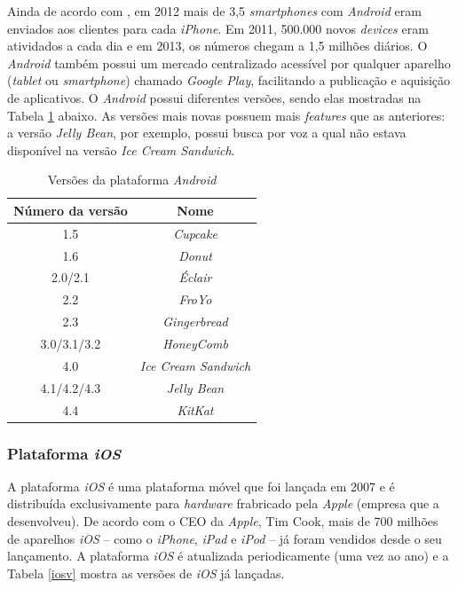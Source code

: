 	 Ainda de acordo com \cite{android2013}, em 2012 mais de 3,5 \textit{smartphones} com \textit{Android} eram enviados aos clientes para cada \textit{iPhone}. Em 2011, 500.000 novos \textit{devices} eram atividados a cada dia e em 2013, os números chegam a 1,5 milhões diários. O \textit{Android} também possui um mercado centralizado acessível por qualquer aparelho (\textit{tablet} ou \textit{smartphone}) chamado \textit{Google Play}, facilitando a publicação e aquisição de aplicativos. 
	O \textit{Android}  possui diferentes versões, sendo elas mostradas na Tabela \ref{androidTab} abaixo.  As versões mais novas possuem mais \textit{features} que as anteriores: a versão \textit{Jelly Bean}, por exemplo, possui busca por voz a qual não estava disponível na versão \textit{Ice Cream Sandwich}. 

\begin{table}[ht]
	\centering	
	\begin{tabular}{cc}
		\toprule
		\textbf{Número da versão} & \textbf{Nome}  \\
		\midrule
		1.5 &  \textit{Cupcake} \\
		1.6 & \textit{Donut} \\
		2.0/2.1 &  \textit{Éclair} \\
		2.2 & \textit{FroYo} \\
		2.3 &  \textit{Gingerbread} \\
		3.0/3.1/3.2 & \textit{HoneyComb} \\
		4.0 & \textit{Ice Cream Sandwich} \\
		4.1/4.2/4.3 & \textit{Jelly Bean} \\
		4.4 &  \textit{KitKat} \\

		\bottomrule
	\end{tabular}
	\caption{ Versões da plataforma \textit{Android}}
	\label{androidTab}
\end{table}


	\subsubsection{Plataforma \textit{iOS}}

	A plataforma \textit{iOS} é uma plataforma móvel que foi lançada em 2007 e é distribuída exclusivamente para \textit{hardware} frabricado pela \textit{Apple} (empresa que a desenvolveu).  De acordo com o CEO da \textit{Apple}, Tim Cook, mais de 700 milhões de aparelhos \textit{iOS} -- como o \textit{iPhone}, \textit{iPad} e \textit{iPod} -- já foram vendidos desde o seu lançamento. A plataforma \textit{iOS} é atualizada periodicamente (uma vez ao ano) e a Tabela \ref{iosv} mostra as versões de \textit{iOS} já lançadas.

